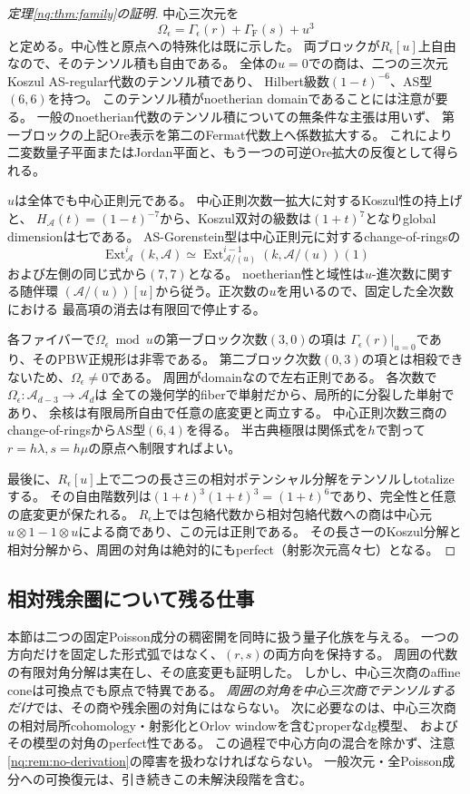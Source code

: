 \begin{proof}[定理\ref{nq:thm:family}の証明]
中心三次元を
\[
 \Omega_\epsilon=\Gamma_\epsilon(r)+\Gamma_{\mathrm F}(s)+u^3
 \tag{Q}\label{nq:eq:total-center}
\]
と定める。中心性と原点への特殊化は既に示した。
両ブロックが$R_\epsilon[u]$上自由なので、そのテンソル積も自由である。
全体の$u=0$での商は、二つの三次元Koszul AS-regular代数のテンソル積であり、
Hilbert級数$(1-t)^{-6}$、AS型$(6,6)$を持つ。
このテンソル積がnoetherian domainであることには注意が要る。
一般のnoetherian代数のテンソル積についての無条件な主張は用いず、
第一ブロックの上記Ore表示を第二のFermat代数上へ係数拡大する。
これにより二変数量子平面またはJordan平面と、もう一つの可逆Ore拡大の反復として得られる。

$u$は全体でも中心正則元である。
中心正則次数一拡大に対するKoszul性の持上げ
\cite[Theorem 2.6, Remark 2.8]{LBSVNE12}と、
$H_{\mathcal A}(t)=(1-t)^{-7}$から、Koszul双対の級数は$(1+t)^7$となりglobal dimensionは七である。
AS-Gorenstein型は中心正則元に対するchange-of-ringsの
\[
 \operatorname{Ext}_{\mathcal A}^{i}(k,\mathcal A)
 \simeq\operatorname{Ext}_{\mathcal A/(u)}^{i-1}
             (k,\mathcal A/(u))(1)
\]
および左側の同じ式から$(7,7)$となる。
noetherian性と域性は$u$-進次数に関する随伴環
$(\mathcal A/(u))[u]$から従う。正次数の$u$を用いるので、固定した全次数における
最高項の消去は有限回で停止する。

各ファイバーで$\Omega_\epsilon\bmod u$の第一ブロック次数$(3,0)$の項は
$\Gamma_\epsilon(r)|_{u=0}$であり、そのPBW正規形は非零である。
第二ブロック次数$(0,3)$の項とは相殺できないため、$\Omega_\epsilon\ne0$である。
周囲がdomainなので左右正則である。
各次数で$\Omega_\epsilon:\mathcal A_{d-3}\to\mathcal A_d$は
全ての幾何学的fiberで単射だから、局所的に分裂した単射であり、
余核は有限局所自由で任意の底変更と両立する。
中心正則次数三商のchange-of-ringsからAS型$(6,4)$を得る。
半古典極限は関係式を$h$で割って$r=h\lambda,s=h\mu$の原点へ制限すればよい。

最後に、$R_\epsilon[u]$上で二つの長さ三の相対ポテンシャル分解をテンソルしtotalizeする。
その自由階数列は$(1+t)^3(1+t)^3=(1+t)^6$であり、完全性と任意の底変更が保たれる。
$R_\epsilon$上では包絡代数から相対包絡代数への商は中心元
$u\otimes1-1\otimes u$による商であり、この元は正則である。
その長さ一のKoszul分解と相対分解から、周囲の対角は絶対的にもperfect（射影次元高々七）となる。
\end{proof}

\subsection{相対残余圏について残る仕事}
本節は二つの固定Poisson成分の稠密開を同時に扱う量子化族を与える。
一つの方向だけを固定した形式弧ではなく、$(r,s)$の両方向を保持する。
周囲の代数の有限対角分解は実在し、その底変更も証明した。
しかし、中心三次商のaffine coneは可換点でも原点で特異である。
\emph{周囲の対角を中心三次商でテンソルするだけ}では、その商や残余圏の対角にはならない。
次に必要なのは、中心三次商の相対局所cohomology・射影化とOrlov windowを含むproperなdg模型、
およびその模型の対角のperfect性である。
この過程で中心方向の混合を除かず、注意\ref{nq:rem:no-derivation}の障害を扱わなければならない。
一般次元・全Poisson成分への可換復元は、引き続きこの未解決段階を含む。